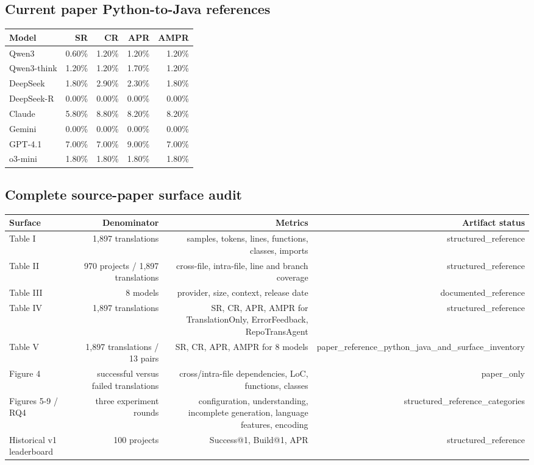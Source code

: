 \documentclass{article}
\begin{document}
\subsection*{Current paper Python-to-Java references}

\begin{tabular}{lrrrr}
\toprule
Model & SR & CR & APR & AMPR \\
\midrule
Qwen3 & 0.60\% & 1.20\% & 1.20\% & 1.20\% \\
Qwen3-think & 1.20\% & 1.20\% & 1.70\% & 1.20\% \\
DeepSeek & 1.80\% & 2.90\% & 2.30\% & 1.80\% \\
DeepSeek-R & 0.00\% & 0.00\% & 0.00\% & 0.00\% \\
Claude & 5.80\% & 8.80\% & 8.20\% & 8.20\% \\
Gemini & 0.00\% & 0.00\% & 0.00\% & 0.00\% \\
GPT-4.1 & 7.00\% & 7.00\% & 9.00\% & 7.00\% \\
o3-mini & 1.80\% & 1.80\% & 1.80\% & 1.80\% \\
\bottomrule
\end{tabular}

\subsection*{Complete source-paper surface audit}

\begin{tabular}{lrrr}
\toprule
Surface & Denominator & Metrics & Artifact status \\
\midrule
Table I & 1,897 translations & samples, tokens, lines, functions, classes, imports & structured\_reference \\
Table II & 970 projects / 1,897 translations & cross-file, intra-file, line and branch coverage & structured\_reference \\
Table III & 8 models & provider, size, context, release date & documented\_reference \\
Table IV & 1,897 translations & SR, CR, APR, AMPR for TranslationOnly, ErrorFeedback, RepoTransAgent & structured\_reference \\
Table V & 1,897 translations / 13 pairs & SR, CR, APR, AMPR for 8 models & paper\_reference\_python\_java\_and\_surface\_inventory \\
Figure 4 & successful versus failed translations & cross/intra-file dependencies, LoC, functions, classes & paper\_only \\
Figures 5-9 / RQ4 & three experiment rounds & configuration, understanding, incomplete generation, language features, encoding & structured\_reference\_categories \\
Historical v1 leaderboard & 100 projects & Success@1, Build@1, APR & structured\_reference \\
\bottomrule
\end{tabular}
\end{document}
